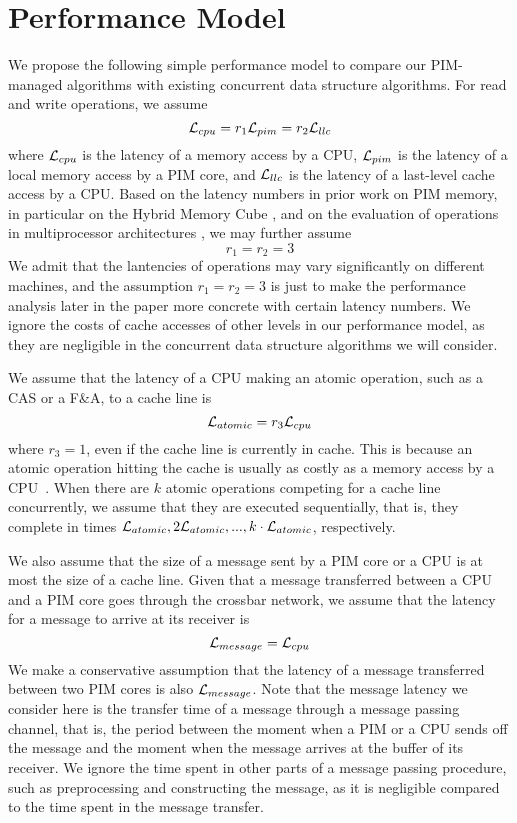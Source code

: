 \section{Performance Model}
\label{section:performance_model}
We propose the following simple performance model to compare 
our PIM-managed algorithms with existing concurrent data structure algorithms.
For read and write operations, we assume 
$$\mathcal{L}_{cpu} = r_1\mathcal{L}_{pim} = r_2\mathcal{L}_{llc}$$
where $\mathcal{L}_{cpu}$ is the latency of a memory access by a CPU,
$\mathcal{L}_{pim}$ is the latency of a local memory access by a PIM core, and
$\mathcal{L}_{llc}$ is the latency of a last-level cache access by a CPU.
Based on the latency numbers in prior work on PIM memory, 
in particular on the Hybrid Memory Cube \cite{website:HMC, Azarkhish16}, 
and on the evaluation of operations in multiprocessor architectures \cite{David13},
we may further assume 
$$r_1 = r_2 = 3$$ 
We admit that the lantencies of operations may vary significantly on different machines, 
and the assumption $r_1 = r_2 = 3$ is just to make the performance analysis later in the paper 
more concrete with certain latency numbers. 
We ignore the costs of cache accesses of other levels in our performance model,
as they are negligible in the concurrent data structure algorithms we will consider.

We assume that the latency of a CPU making an atomic operation, such as a CAS or a F\&A,
to a cache line is 
$$\mathcal{L}_{atomic} = r_3\mathcal{L}_{cpu}$$ 
where $r_3 = 1$, even if the cache line is currently in cache.
This is because an atomic operation hitting the cache is usually 
as costly as a memory access by a CPU~\cite{David13}.
When there are $k$ atomic operations competing for a cache line concurrently,
we assume that they are executed sequentially, that is,
they complete in times $\mathcal{L}_{atomic}, 2\mathcal{L}_{atomic},..., k\cdot\mathcal{L}_{atomic}$, respectively.

We also assume that the size of a message sent by a PIM core or a CPU is at most 
the size of a cache line.
Given that a message transferred between a CPU and a PIM core goes through
the crossbar network, we assume that the latency for a message to arrive at its receiver is 
$$\mathcal{L}_{message} = \mathcal{L}_{cpu}$$
We make a conservative assumption that the latency of a message transferred 
between two PIM cores is also $\mathcal{L}_{message}$.
Note that the message latency we consider here is the transfer time of a message
through a message passing channel, that is, the period between the moment
when a PIM or a CPU sends off the message and the moment when
the message arrives at the buffer of its receiver.
We ignore the time spent in other parts of a message passing procedure,
such as preprocessing and constructing the message,
as it is negligible compared to the time spent in the message transfer.